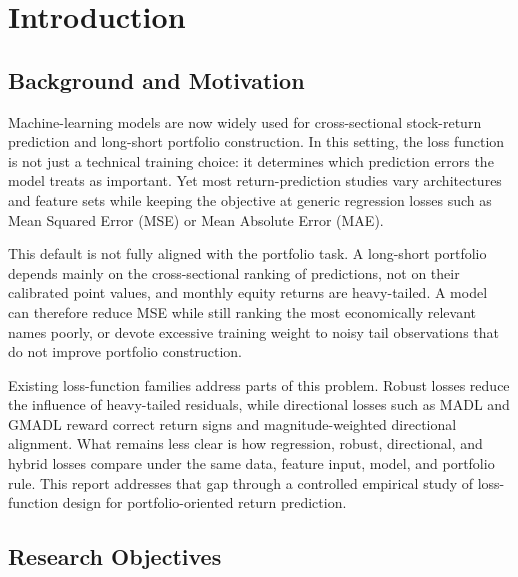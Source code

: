 
\chapter{Introduction}

\label{ch1:introduction}

\section{Background and Motivation}

\label{ch1:background}

Machine-learning models are now widely used for cross-sectional stock-return prediction and long-short portfolio construction. In this setting, the loss function is not just a technical training choice: it determines which prediction errors the model treats as important. Yet most return-prediction studies vary architectures and feature sets while keeping the objective at generic regression losses such as Mean Squared Error (MSE) or Mean Absolute Error (MAE).

This default is not fully aligned with the portfolio task. A long-short portfolio depends mainly on the cross-sectional ranking of predictions, not on their calibrated point values, and monthly equity returns are heavy-tailed. A model can therefore reduce MSE while still ranking the most economically relevant names poorly, or devote excessive training weight to noisy tail observations that do not improve portfolio construction.

Existing loss-function families address parts of this problem. Robust losses reduce the influence of heavy-tailed residuals, while directional losses such as MADL and GMADL \cite{ref7, ref8} reward correct return signs and magnitude-weighted directional alignment. What remains less clear is how regression, robust, directional, and hybrid losses compare under the same data, feature input, model, and portfolio rule. This report addresses that gap through a controlled empirical study of loss-function design for portfolio-oriented return prediction.

\section{Research Objectives}

\label{ch1:objectives}

